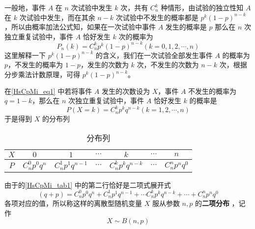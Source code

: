 一般地，事件 $A$ 在 $n$ 次试验中发生 $k$ 次，共有 $C_n^k$ 种情形，由试验的独立性知 $A$ 在 $k$ 次试验中发生，而在其余 $n-k$ 次试验中不发生的概率都是 $p^k(1-p)^{n-k}$，所以由概率加法公式知，如果在一次试验中事件 $A$ 发生的概率是 $p$ 那么在 $n$ 次独立重复试验中，事件 $A$ 恰好发生 $k$ 次的概率为
\begin{equation}\label{HsCpMi_eq1} 
P_n(k) = C_n^kp^k(1-p)^{n-k}(k=0,1,2,\cdots,n)
\end{equation}
这里解释一下 $p^k(1-p)^{n-k}$ 的含义，我们在一次试验全部发生事件 $A$ 的概率为 $p$，不发生的概率为 $1-p$，发生的次数为 $k$ 次，不发生的次数为 $n-k$ 次，根据分步乘法计数原理，可得 $p^k(1-p)^{n-k}$。

在\autoref{HsCpMi_eq1} 中若将事件 $A$ 发生的次数设为 $X$，事件 $A$ 不发生的概率为 $q = 1 - k$，那么在 $n$ 次独立重复试验中，事件 $A$ 恰好发生 $k$ 的概率是
\begin{equation}
P(X=k) = C_n^kp^kq^{n-k}(k = 1,2,\cdots,n)
\end{equation}
于是得到 $X$ 的分布列

\begin{table}[ht]
\centering
\caption{分布列}\label{HsCpMi_tab1} 
\begin{tabular}{|c|c|c|c|c|c|c|}
\hline
$X$ & $0$ & $1$ & $\cdots$ & $k$ & $\cdots$ & $n$ \\
\hline
$P$ & $C_n^0p^0q^n$ & $C_n^1p^1q^{n-1}$ & $\cdots$ & $C_n^kp^kq^{n-k}$ & $\cdots$ & $C_n^np^nq^0$ \\
\hline
\end{tabular}
\end{table}

由于的\autoref{HsCpMi_tab1} 中的第二行恰好是二项式展开式
\begin{equation}
(q+p) = C_n^0p^0q^n + C_n^1p^1q^{n-1}+\cdots C_n^kp^kq^{n-k}+\cdots + C_n^np^nq^0
\end{equation}
各项对应的值，所以称这样的离散型随机变量 $X$ 服从参数 $n,p$ 的\textbf{二项分布} ，记作
\begin{equation}
X\sim B(n,p)
\end{equation}